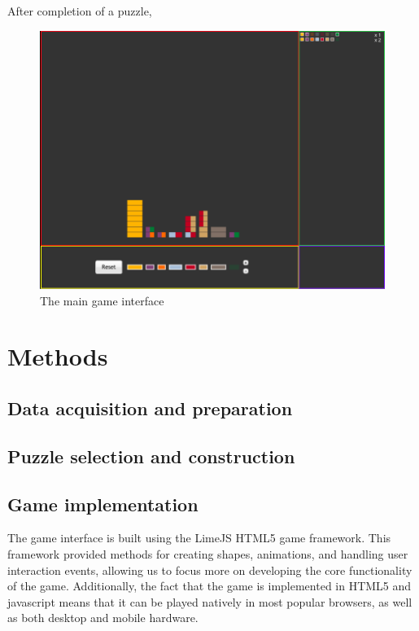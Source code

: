 \documentclass[12pt,twocolumn]{article}
\begin{document}
After completion of a puzzle, 
\begin{figure}[t]

\centering
\includegraphics[width=5in]{gamescreen}
\caption{The main game interface}
\label{fig:gamescreen}
\end{figure}

\section*{Methods}

\subsection*{Data acquisition and preparation}

\subsection*{Puzzle selection and construction}

\subsection*{Game implementation}
The game interface is built using the LimeJS HTML5 game framework. This framework provided methods for creating shapes,
animations, and handling user interaction events, allowing us to focus more on developing the core functionality of the game.
Additionally, the fact that the game is implemented in HTML5 and javascript means that it can be played natively in most 
popular browsers, as well as both desktop and mobile hardware.
\end{document}
